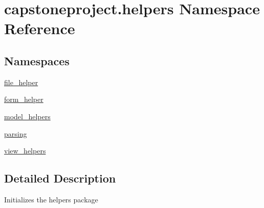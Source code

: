 \hypertarget{namespacecapstoneproject_1_1helpers}{}\section{capstoneproject.\+helpers Namespace Reference}
\label{namespacecapstoneproject_1_1helpers}
\subsection*{Namespaces}
\begin{DoxyCompactItemize}
\item 
 \mbox{\hyperlink{namespacecapstoneproject_1_1helpers_1_1file__helper}{file\+\_\+helper}}
\item 
 \mbox{\hyperlink{namespacecapstoneproject_1_1helpers_1_1form__helper}{form\+\_\+helper}}
\item 
 \mbox{\hyperlink{namespacecapstoneproject_1_1helpers_1_1model__helpers}{model\+\_\+helpers}}
\item 
 \mbox{\hyperlink{namespacecapstoneproject_1_1helpers_1_1parsing}{parsing}}
\item 
 \mbox{\hyperlink{namespacecapstoneproject_1_1helpers_1_1view__helpers}{view\+\_\+helpers}}
\end{DoxyCompactItemize}


\subsection{Detailed Description}
\begin{DoxyVerb}Initializes the helpers package
\end{DoxyVerb}
 